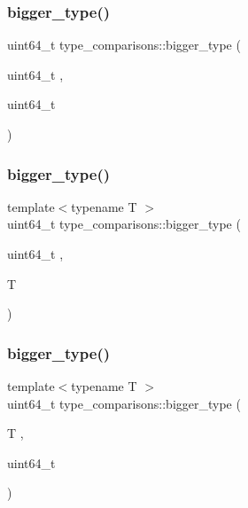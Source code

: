 \hypertarget{namespacetype__comparisons_a32fdd7e341dd5b5736450f4af91b696b}{}\label{namespacetype__comparisons_a32fdd7e341dd5b5736450f4af91b696b} 
\subsubsection{\texorpdfstring{bigger\+\_\+type()}{bigger\_type()}\hspace{0.1cm}{\footnotesize\ttfamily [10/12]}}
{\footnotesize\ttfamily uint64\+\_\+t type\+\_\+comparisons\+::bigger\+\_\+type (\begin{DoxyParamCaption}\item[{uint64\+\_\+t}]{,  }\item[{uint64\+\_\+t}]{ }\end{DoxyParamCaption})}

\hypertarget{namespacetype__comparisons_ae546a6ad39ebc6f7f63dd4a211ac76b6}{}\label{namespacetype__comparisons_ae546a6ad39ebc6f7f63dd4a211ac76b6} 
\subsubsection{\texorpdfstring{bigger\+\_\+type()}{bigger\_type()}\hspace{0.1cm}{\footnotesize\ttfamily [11/12]}}
{\footnotesize\ttfamily template$<$typename T $>$ \\
uint64\+\_\+t type\+\_\+comparisons\+::bigger\+\_\+type (\begin{DoxyParamCaption}\item[{uint64\+\_\+t}]{,  }\item[{T}]{ }\end{DoxyParamCaption})}

\hypertarget{namespacetype__comparisons_adef2fefbc448ca4035cb44acbd8aaa8a}{}\label{namespacetype__comparisons_adef2fefbc448ca4035cb44acbd8aaa8a} 
\subsubsection{\texorpdfstring{bigger\+\_\+type()}{bigger\_type()}\hspace{0.1cm}{\footnotesize\ttfamily [12/12]}}
{\footnotesize\ttfamily template$<$typename T $>$ \\
uint64\+\_\+t type\+\_\+comparisons\+::bigger\+\_\+type (\begin{DoxyParamCaption}\item[{T}]{,  }\item[{uint64\+\_\+t}]{ }\end{DoxyParamCaption})}

